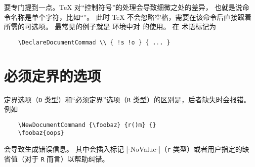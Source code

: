 \documentclass{l3doc}
\begin{document}
%
要专门提到一点。\TeX{} 对“控制符号”的处理会导致细微之处的差异，
也就是说命令名称是单个字符，比如“\cmd{\\}”。
此时 \TeX{} 不会忽略空格，需要在该命令后直接跟着所需的可选项。
最常见的例子就是  环境中对 \cmd{\\} 的使用。
在  术语标记为
\begin{verbatim}
    \DeclareDocumentCommad \\ { !s !o } { ... }
\end{verbatim}

%
\section{必须定界的选项}

%
定界选项（\texttt{D} 类型）和“必须定界”选项（\texttt{R} 类型）的区别是，后者缺失时会报错。
例如
\begin{verbatim}
    \NewDocumentCommand {\foobaz} {r()m} {}
    \foobaz{oops}
\end{verbatim}
会导致生成错误信息。
其中会插入标记 |-NoValue-|（\texttt{r} 类型）或者用户指定的缺省值（对于 \texttt{R} 而言）以帮助纠错。
\end{document}
